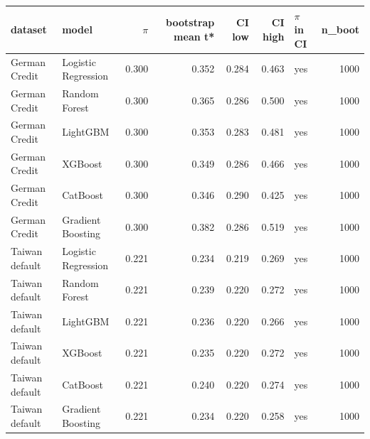 \begin{tabular}{llrrrrlr}
\toprule
dataset & model & $\pi$ & bootstrap mean t* & CI low & CI high & $\pi$ in CI & n\_boot \\
\midrule
German Credit & Logistic Regression & 0.300 & 0.352 & 0.284 & 0.463 & yes & 1000 \\
German Credit & Random Forest & 0.300 & 0.365 & 0.286 & 0.500 & yes & 1000 \\
German Credit & LightGBM & 0.300 & 0.353 & 0.283 & 0.481 & yes & 1000 \\
German Credit & XGBoost & 0.300 & 0.349 & 0.286 & 0.466 & yes & 1000 \\
German Credit & CatBoost & 0.300 & 0.346 & 0.290 & 0.425 & yes & 1000 \\
German Credit & Gradient Boosting & 0.300 & 0.382 & 0.286 & 0.519 & yes & 1000 \\
Taiwan default & Logistic Regression & 0.221 & 0.234 & 0.219 & 0.269 & yes & 1000 \\
Taiwan default & Random Forest & 0.221 & 0.239 & 0.220 & 0.272 & yes & 1000 \\
Taiwan default & LightGBM & 0.221 & 0.236 & 0.220 & 0.266 & yes & 1000 \\
Taiwan default & XGBoost & 0.221 & 0.235 & 0.220 & 0.272 & yes & 1000 \\
Taiwan default & CatBoost & 0.221 & 0.240 & 0.220 & 0.274 & yes & 1000 \\
Taiwan default & Gradient Boosting & 0.221 & 0.234 & 0.220 & 0.258 & yes & 1000 \\
\bottomrule
\end{tabular}
